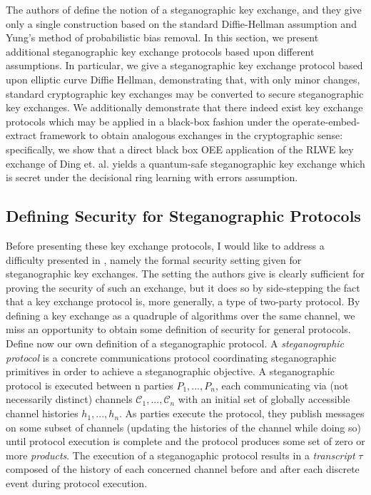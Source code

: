 \documentclass{article}
\begin{document}
The authors of \cite{BiglouPubKey} define the notion of a steganographic key exchange, and they give 
only a single construction based on the standard Diffie-Hellman assumption and Yung's method of probabilistic 
bias removal.  In this section, we present additional steganographic key exchange protocols based upon different 
assumptions.  In particular, we give a steganographic key exchange protocol based upon elliptic curve Diffie Hellman, 
demonstrating that, with only minor changes, standard cryptographic key exchanges may be converted to secure 
steganographic key exchanges.  We additionally demonstrate that there indeed exist key exchange protocols which may be 
applied in a black-box fashion under the operate-embed-extract framework to obtain analogous exchanges in the cryptographic 
sense: specifically, we show that a direct black box OEE application of the RLWE key exchange of Ding et. al. \cite{RLWE} yields a
quantum-safe steganographic key exchange which is secret under the decisional ring learning with errors assumption.

\subsection{Defining Security for Steganographic Protocols}

Before presenting these key exchange protocols, I would like to address a difficulty presented in \cite{BiglouPubKey}, 
namely the formal security setting given for steganographic key exchanges.  The setting the authors give is clearly 
sufficient for proving the security of such an exchange, but it does so by side-stepping the fact that a 
key exchange protocol is, more generally, a type of two-party protocol.  By defining a key exchange as a quadruple of 
algorithms over the same channel, we miss an opportunity to obtain some definition of security for general protocols.
\newline\newline
Define now our own definition of a steganographic protocol.  A \textit{steganographic protocol} is a concrete 
communications protocol coordinating steganographic primitives in order to achieve a steganographic objective.  
A steganographic protocol is executed between n parties $P_1,...,P_n$, each communicating via (not necessarily distinct)
channels $\mathcal{C}_1,...,\mathcal{C}_n$ with an initial set of globally accessible channel histories $h_1,...,h_n$.  
As parties execute the protocol, they publish messages on some subset of channels (updating the histories of the channel while doing so) 
until protocol execution is complete and the protocol produces some set of zero or more \textit{products}.  
The execution of a steganogaphic protocol results in a \textit{transcript} $\tau$ composed of the history of each concerned 
channel before and after each discrete event during protocol execution.
\end{document}
